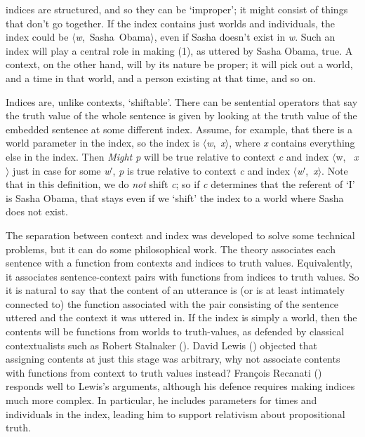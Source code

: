 \documentclass[
  11pt,
  letterpaper,
  DIV=11,
  numbers=noendperiod,
  twoside]{scrartcl}
\begin{document}
indices are structured, and so they can be `improper'; it might consist
of things that don't go together. If the index contains just worlds and
individuals, the index could be
\(\langle\)\emph{w},~Sasha~Obama\(\rangle\), even if Sasha doesn't exist
in \emph{w}. Such an index will play a central role in making (1), as
uttered by Sasha Obama, true. A context, on the other hand, will by its
nature be proper; it will pick out a world, and a time in that world,
and a person existing at that time, and so on.

Indices are, unlike contexts, `shiftable'. There can be sentential
operators that say the truth value of the whole sentence is given by
looking at the truth value of the embedded sentence at some different
index. Assume, for example, that there is a world parameter in the
index, so the index is \(\langle\)\emph{w},~\emph{x}\(\rangle\), where
\emph{x} contains everything else in the index. Then \emph{Might p} will
be true relative to context \emph{c} and index \(\langle\)w,~
\emph{x}\(\rangle\) just in case for some \emph{w}′, \emph{p} is true
relative to context \emph{c} and index
\(\langle\)\emph{w}′,~\emph{x}\(\rangle\). Note that in this definition,
we do \emph{not} shift \emph{c}; so if \emph{c} determines that the
referent of `I' is Sasha Obama, that stays even if we `shift' the index
to a world where Sasha does not exist.

The separation between context and index was developed to solve some
technical problems, but it can do some philosophical work. The theory
associates each sentence with a function from contexts and indices to
truth values. Equivalently, it associates sentence-context pairs with
functions from indices to truth values. So it is natural to say that the
content of an utterance is (or is at least intimately connected to) the
function associated with the pair consisting of the sentence uttered and
the context it was uttered in. If the index is simply a world, then the
contents will be functions from worlds to truth-values, as defended by
classical contextualists such as Robert Stalnaker
(). David Lewis
() objected that assigning contents at
just this stage was arbitrary, why not associate contents with functions
from context to truth values instead? François Recanati
() responds well to Lewis's arguments,
although his defence requires making indices much more complex. In
particular, he includes parameters for times and individuals in the
index, leading him to support relativism about propositional truth.
\end{document}
